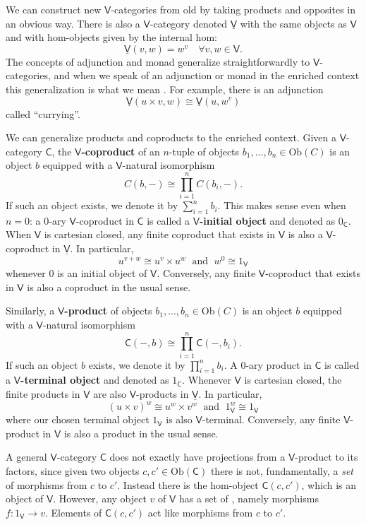 \documentclass{amsart}
\newcommand{\define}[1]{{\bf \boldmath{#1}}}
\theoremstyle{definition}
\newcommand{\V}{\mathsf{V}}
\newcommand{\C}{\mathsf{C}}
\newcommand{\Obj}{\mathrm{Ob}}
\newcommand{\maps}{\colon}
\begin{document}
We can construct new $\V$-categories from old by taking products and opposites in an obvious way.   There is also a $\V$-category denoted $\underline{\V}$ with the same objects as 
$\V$ and with hom-objects given by the internal hom:
\[   \underline{\V}(v,w) = w^v   \quad \forall v,w \in \V  .\]
The concepts of adjunction and monad generalize straightforwardly to $\V$-categories,
and when we speak of an adjunction or monad in the enriched context this generalization
is what we mean \cite{kelly}.   For example, there is an adjunction
\[    \underline{\V}(u \times v, w) \cong \underline{\V}(u, w^v ) \]
called ``currying''.    

%

We can generalize products and coproducts to the enriched context.
Given a $\V$-category $\C$, the \textbf{$\V$-coproduct} of an $n$-tuple of objects $b_1, \dots, b_n \in \Obj(C)$ is an object $b$ equipped with a $\V$-natural isomorphism
\[           C(b,-) \cong \prod_{i = 1}^n C(b_i,-). \]
If such an object exists, we denote it by $\sum_{i=1}^n b_i$.  
This makes sense even when $n = 0$: a 0-ary $\V$-coproduct in $\C$ is called a \textbf{$\V$-initial object} and denoted as $0_\C$.   When $\V$ is cartesian
closed, any finite coproduct that exists in $\V$ is also a $\V$-coproduct in $\underline{\V}$.   In particular,
\[          u^{v+w} \cong u^v \times u^w \; \textrm{ and } \;  w^0 \cong 1_\V \]
whenever $0$ is an initial object of $\V$.  Conversely, any finite $\V$-coproduct that
exists in $\V$ is also a coproduct in the usual sense.

Similarly, a \textbf{$\V$-product} of objects $b_1, \dots , b_n \in \Obj(C)$ is an object $b$ equipped with a $\V$-natural isomorphism
\begin{equation}
\label{eq:prod}          \C(-,b) \cong \prod_{i=1}^n \C(-,b_i). 
\end{equation}
If such an object $b$ exists, we denote it by $\prod_{i=1}^n b_i$.   A 0-ary product in $\C$ is called a \textbf{$\V$-terminal object} and denoted as $1_\C$.     Whenever $\V$ is cartesian closed, the finite products in $\V$ are also $\V$-products in $\underline{\V}$.  In particular,
\[           (u \times v)^w \cong u^w \times v^w \; \textrm{ and } \; 1_\V^w \cong 1_\V \]
where our chosen terminal object $1_\V$ is also $\V$-terminal.
Conversely, any finite $\V$-product in $\V$ is also a product in the usual sense. 

A general $\V$-category $\C$ does not exactly have projections from a 
$\V$-product to its factors, since given two objects $c, c' \in \Obj(\C)$ there is not, fundamentally, a \emph{set} of morphisms from $c$ to $c'$.  Instead there is the hom-object $\C(c,c')$, which is an object of $\V$.    However, any object $v$ of $\V$ has a set of \define{elements}, namely morphisms $f \maps 1_\V \to v$.   Elements of $\C(c,c')$ act like morphisms from $c$ to $c'$.  
\end{document}
